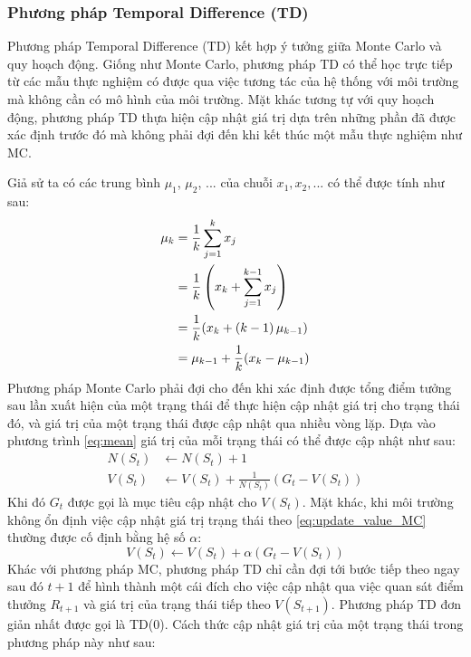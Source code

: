\subsubsection{Phương pháp Temporal Difference (TD)}
Phương pháp Temporal Difference (TD) kết hợp ý tưởng giữa Monte Carlo và quy hoạch động. Giống như Monte Carlo, phương pháp TD có thể học trực tiếp từ các mẫu thực nghiệm có được qua việc tương tác của hệ thống với môi trường mà không cần có mô hình của môi trường. Mặt khác tương tự với quy hoạch động, phương pháp TD thựa hiện cập nhật giá trị dựa trên những phần đã được xác định trước đó mà không phải đợi đến khi kết thúc một mẫu thực nghiệm như MC.

Giả sử ta có các trung bình $\mu_{1}$, $\mu_{2}$, ... của chuỗi $x_1, x_2, ...$ có thể được tính như sau:
\begin{align}
\mu_{k} = {}& \frac{1}{k}\sum_{j=1}^{k}x_{j} \notag \\
= {}& \frac{1}{k} \left(x_k + \sum_{j = 1}^{k - 1}x_j\right) \notag \\
= {}& \frac{1}{k}(x_k + \left(k - 1\right)\mu_{k-1}) \notag \\
= {}& \mu_{k - 1} + \frac{1}{k}(x_k - \mu_{k-1}) \label{eq:mean}
\end{align}
Phương pháp Monte Carlo phải đợi cho đến khi xác định được tổng điểm tưởng sau lần xuất hiện của một trạng thái để thực hiện cập nhật giá trị cho trạng thái đó, và giá trị của một trạng thái được cập nhật qua nhiều vòng lặp. Dựa vào phương trình \ref{eq:mean} giá trị của mỗi trạng thái có thể được cập nhật như sau:
\begin{align}
N(\mathit{S}_{t}) & \leftarrow N(\mathit{S}_{t}) + 1 \\
V(\mathit{S}_t) & \leftarrow V(\mathit{S}_t) + \frac{1}{N(\mathit{S}_{t})}(\mathit{G_t} - V(\mathit{S}_t)) \label{eq:update_value_MC}
\end{align}
Khi đó $\mathit{G}_t$ được gọi là mục tiêu cập nhật cho $V(S_t)$. Mặt khác, khi môi trường không ổn định việc cập nhật giá trị trạng thái theo \ref{eq:update_value_MC}  thường được cố định bằng hệ số $\alpha$:
\begin{equation}
V(\mathit{S}_t) \leftarrow V(\mathit{S}_t) + \alpha(\mathit{G_t} - V(\mathit{S}_t))
\end{equation}
Khác với phương pháp MC, phương pháp TD chỉ cần đợi tới bước tiếp theo ngay sau đó $t+1$ để hình thành một cái đích cho việc cập nhật qua việc quan sát điểm thưởng $R_{t+1}$ và giá trị của trạng thái tiếp theo $V(\mathit{S}_{t+1})$. Phương pháp TD đơn giản nhất được gọi là TD(0). Cách thức cập nhật giá trị của một trạng thái trong phương pháp này như sau:
